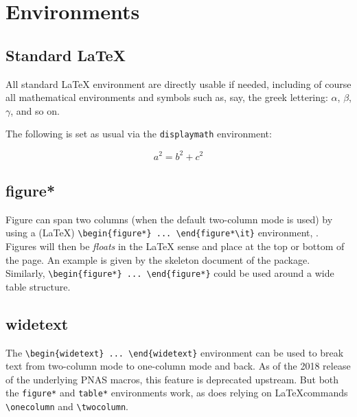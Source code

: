 \documentclass[letterpaper,9pt,twocolumn,twoside,]{pinp}
\begin{document}
\hypertarget{environments}{%
\section{Environments}\label{environments}}

\hypertarget{standard-latex}{%
\subsection{Standard LaTeX}\label{standard-latex}}

All standard LaTeX environment are directly usable if needed, including
of course all mathematical environments and symbols such as, say, the
greek lettering: \(\alpha\), \(\beta\), \(\gamma\), and so on.

The following is set as usual via the \texttt{displaymath} environment:

\begin{displaymath}
    a^2 = b^2 + c^2
\end{displaymath}

\hypertarget{figure}{%
\subsection{figure*}\label{figure}}

Figure can span two columns (when the default two-column mode is used)
by using a (LaTeX)
\texttt{\textbackslash{}begin\{figure*\}\ ...\ \textbackslash{}end\{figure*\textbackslash{}it\}}
environment, . Figures will then be \emph{floats} in the LaTeX sense and
place at the top or bottom of the page. An example is given by the
skeleton document of the package. Similarly,
\texttt{\textbackslash{}begin\{figure*\}\ ...\ \textbackslash{}end\{figure*\}}
could be used around a wide table structure.

\hypertarget{widetext}{%
\subsection{widetext}\label{widetext}}

The
\texttt{\textbackslash{}begin\{widetext\}\ ...\ \textbackslash{}end\{widetext\}}
environment can be used to break text from two-column mode to one-column
mode and back. As of the 2018 release of the underlying PNAS macros,
this feature is deprecated upstream. But both the \texttt{figure*} and
\texttt{table*} environments work, as does relying on \LaTeX commands
\texttt{\textbackslash{}onecolumn} and
\texttt{\textbackslash{}twocolumn}.
\end{document}
